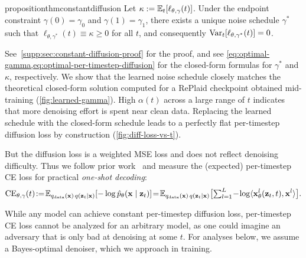 \documentclass{article}
\begin{document}
\vspace{0.5em}
\begin{restatable}{proposition}{thmconstantdiffusion}
\label{thm:constant_diffusion_loss}
Let $\kappa:=\mathbb{E}_t[\ell_{\theta, \gamma}(t)]$. Under the endpoint constraint $\gamma(0)=\gamma_0$ and $\gamma(1)=\gamma_1$, there exists a unique noise schedule $\gamma^*$ such that $\ell_{\theta, \gamma^*}(t)\equiv\kappa\geq0$ for all $t$, and consequently $\operatorname{Var}_t [\ell_{\theta, \gamma^*}(t)]=0$.
%
%
%
%
%
\end{restatable}

See~\cref{supp:sec:constant-diffusion-proof} for the proof, and see \cref{eq:optimal-gamma,eq:optimal-per-timestep-diffusion} for the closed-form formulas for $\gamma^*$ and $\kappa$, respectively. We show that the learned noise schedule closely matches the theoretical closed-form solution computed for a RePlaid checkpoint obtained mid-training (\cref{fig:learned-gamma}). High $\alpha(t)$ across a large range of $t$ indicates that more denoising effort is spent near clean data. Replacing the learned schedule with the closed-form schedule leads to a perfectly flat per-timestep diffusion loss by construction (\cref{fig:diff-loss-vs-t}). 

But the diffusion loss is a weighted MSE loss and does not reflect denoising difficulty. Thus we follow prior work~\citep{chen2026langflow} and measure the (expected) per-timestep CE loss for practical \textit{one-shot decoding}:
    \begin{align}\label{eq:ce-loss-per-t}
    \operatorname{CE}_{\theta, \gamma} (t) \! := \! \mathbb{E}_{q_{\mathrm{data}}({\mathbf x})\,q({\mathbf z}_t \mid {\mathbf x})}[-\log \hat p_\theta ({\mathbf x}\mid{\mathbf z}_t)] \! = \! \mathbb{E}_{q_{\mathrm{data}}({\mathbf x})\,q({\mathbf z}_t \mid {\mathbf x})}\big[{\textstyle\sum}_{l=1}^L \! - \! \log \langle {\mathbf x}_\theta^l({\mathbf z}_t,t), {\mathbf x}^l \rangle \big].
\end{align}
\vspace{-1.5em}
%

%
%

%

While any model can achieve constant per-timestep diffusion loss, per-timestep CE loss cannot be analyzed for an arbitrary model, as one could imagine an adversary that is only bad at denoising at some $t$. For analyses below, we assume a Bayes-optimal denoiser, which we approach in training.

%
%
%

%
\end{document}
